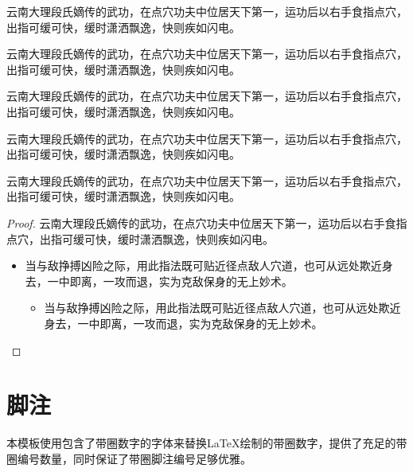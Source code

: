 \documentclass[doctor, vlined]{DissertUESTC}
\begin{document}
	\begin{proposition}[具体名称]
		云南大理段氏嫡传的武功，在点穴功夫中位居天下第一，运功后以右手食指点穴，出指可缓可快，缓时潇洒飘逸，快则疾如闪电。
	\end{proposition}
	
	\begin{corollary}[具体名称]
		云南大理段氏嫡传的武功，在点穴功夫中位居天下第一，运功后以右手食指点穴，出指可缓可快，缓时潇洒飘逸，快则疾如闪电。
	\end{corollary}
	
	\begin{lemma}[具体名称]
		云南大理段氏嫡传的武功，在点穴功夫中位居天下第一，运功后以右手食指点穴，出指可缓可快，缓时潇洒飘逸，快则疾如闪电。
	\end{lemma}

	\begin{example}[具体名称]
		云南大理段氏嫡传的武功，在点穴功夫中位居天下第一，运功后以右手食指点穴，出指可缓可快，缓时潇洒飘逸，快则疾如闪电。
	\end{example}

	\begin{assumption}[具体名称]
		云南大理段氏嫡传的武功，在点穴功夫中位居天下第一，运功后以右手食指点穴，出指可缓可快，缓时潇洒飘逸，快则疾如闪电。
	\end{assumption}
	
	\begin{proof}
		云南大理段氏嫡传的武功，在点穴功夫中位居天下第一，运功后以右手食指点穴，出指可缓可快，缓时潇洒飘逸，快则疾如闪电。
		\begin{itemize}
			\item 当与敌挣搏凶险之际，用此指法既可贴近径点敌人穴道，也可从远处欺近身去，一中即离，一攻而退，实为克敌保身的无上妙术。
			\begin{itemize}
				\item 当与敌挣搏凶险之际，用此指法既可贴近径点敌人穴道，也可从远处欺近身去，一中即离，一攻而退，实为克敌保身的无上妙术。
			\end{itemize}
		\end{itemize}
	\end{proof}
	
	\newpage

	\section{脚注}
	
	本模板使用包含了带圈数字的字体来替换LaTeX绘制的带圈数字，提供了充足的带圈编号数量，同时保证了带圈脚注编号足够优雅。
	
\end{document}
